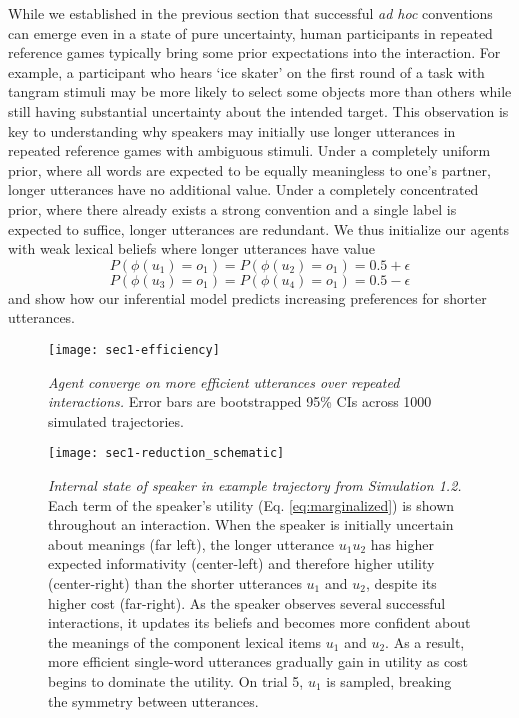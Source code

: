 While we established in the previous section that successful \emph{ad hoc} conventions can emerge even in a state of pure uncertainty, human participants in repeated reference games typically bring some prior expectations into the interaction.
For example, a participant who hears `ice skater' on the first round of a task with tangram stimuli may be more likely to select some objects more than others while still having substantial uncertainty about the intended target.
This observation is key to understanding why speakers may initially use longer utterances in repeated reference games with ambiguous stimuli. 
Under a completely uniform prior, where all words are expected to be equally meaningless to one's partner, longer utterances have no additional value. 
Under a completely concentrated prior, where there already exists a strong convention and a single label is expected to suffice, longer utterances are redundant.
We thus initialize our agents with weak lexical beliefs where longer utterances have value
$$P(\phi(u_1) = o_1) = P(\phi(u_2) = o_1) = 0.5 + \epsilon$$ 
$$P(\phi(u_3) = o_1) = P(\phi(u_4) = o_1) = 0.5 - \epsilon$$
and show how our inferential model predicts increasing preferences for shorter utterances.
\begin{figure}[b]
\centering
    \texttt{[image: sec1-efficiency]}
  \caption{\emph{Agent converge on more efficient utterances over repeated interactions.} Error bars are bootstrapped 95\% CIs across 1000 simulated trajectories.}
  \label{fig:sec1efficiency}
\end{figure}


\begin{figure*}[t]
\centering
    \texttt{[image: sec1-reduction\_schematic]}
  \caption{\emph{Internal state of speaker in example trajectory from Simulation 1.2.} Each term of the speaker's utility (Eq. \ref{eq:marginalized}) is shown throughout an interaction. When the speaker is initially uncertain about meanings (far left), the longer utterance $u_1u_2$ has higher expected informativity (center-left) and therefore higher utility (center-right) than the shorter utterances $u_1$ and $u_2$, despite its higher cost (far-right). As the speaker observes several successful interactions, it updates its beliefs and becomes more confident about the meanings of the component lexical items $u_1$ and $u_2$. As a result, more efficient single-word utterances gradually gain in utility as cost begins to dominate the utility. On trial 5, $u_1$ is sampled, breaking the symmetry between utterances.}
  \label{fig:sec1internals}
\end{figure*}


